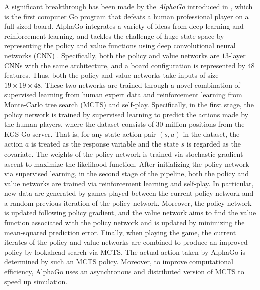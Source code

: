 A significant breakthrough has been made by the  \emph{AlphaGo}  introduced in  \cite{silver2016mastering},  which is the first computer Go program that defeats a human professional player on a full-sized board. AlphaGo integrates a variety of ideas from deep learning and reinforcement learning, and tackles the challenge of huge state space by representing the policy and value functions using deep convolutional neural networks (CNN) \cite{krizhevsky2012imagenet}. Specifically, both the policy and value networks are $13$-layer CNNs with the same architecture, and a board configuration is represented by $48$ features.  Thus, both the policy and value networks take  inputs of size 
 $19\times 19 \times 48$. 
These two networks are trained through  a novel combination of supervised learning from human expert data and reinforcement learning from Monte-Carlo tree search (MCTS) and self-play. Specifically, in the first stage, the policy network is trained by supervised learning to predict the actions made by the  human players, where the dataset consists of $30$ million positions from the KGS Go server. 
That is, for any state-action pair $(s,a)$ in the dataset, the action $a$ is treated as the response variable and the state $s$ is regarded as the covariate. The weights of  
  the policy network is trained via stochastic gradient ascent to maximize the likelihood function. 
  After initializing the policy network via supervised learning, 
 in the second stage of the pipeline, both the policy and value networks are trained via reinforcement learning and self-play. In particular, new data are generated by  games played between the current policy network and a random previous iteration of the policy network. Moreover, 
 the policy network is updated following policy gradient, 
 and the value network aims to find the value function associated with the policy network and is updated by minimizing the mean-squared prediction error. 
 Finally, when playing the game, the current iterates of the  policy and value networks are combined to produce an improved policy by lookahead search via MCTS. The actual action taken by AlphaGo is determined by such an MCTS policy. Moreover, to improve computational efficiency, AlphaGo uses an asynchronous and distributed version of MCTS to speed up   simulation. 
 
